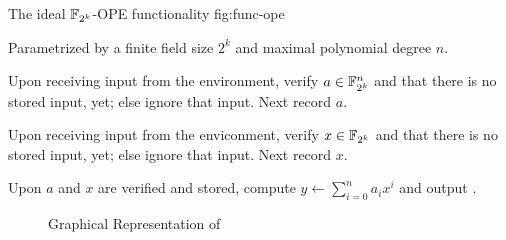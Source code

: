 %
%
\label{sec:protocol}

\begin{JWfunc}%
  {\JWfuncSymOPE}%
  {The ideal $\mathbb{F}_{2^k}{}$-OPE functionality \JWfuncSymOPE{}}%
  {fig:func-ope}

  Parametrized by a finite field size $2^k$ and maximal polynomial degree $n$.

  \begin{JWfuncSteps}

  \item Upon receiving input  from the environment, verify
    $a \in \mathbb{F}_{2^k}^n$ and that there is no stored input, yet; else
    ignore that input. Next record $a$.

  \item Upon receiving input  from the enviconment,
    verify $x \in \mathbb{F}_{2^k}{}$ and that there is no stored input, yet;
    else ignore that input. Next record $x$.

  \item Upon $a$ and $x$ are verified and stored, compute $y \leftarrow
    \sum_{i=0}^n a_ix^i$ and output .

  \end{JWfuncSteps}
\end{JWfunc}

\begin{figure}[ht]

  \label{fig:graph-ope}
  \centering


  \caption{Graphical Representation of \JWfuncSymOPE}

\end{figure}


